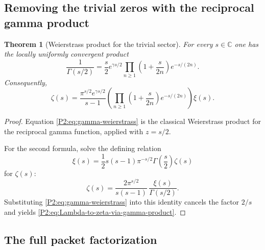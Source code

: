 \documentclass[11pt,a4paper]{article}
\numberwithin{equation}{section}
\newtheorem{theorem}{Theorem}[section]
\theoremstyle{definition}
\theoremstyle{remark}
\newcommand{\CC}{\mathbb C}
\begin{document}
\subsection{Removing the trivial zeros with the reciprocal gamma product}

\begin{theorem}[Weierstrass product for the trivial sector]\label{P2:thm:gamma-product}
For every $s\in\CC$ one has the locally uniformly convergent product
\begin{equation}\label{P2:eq:gamma-weierstrass}
\frac{1}{\Gamma(s/2)}=\frac{s}{2}e^{\gamma s/2}\prod_{n\ge 1}\left(1+\frac{s}{2n}\right)e^{-s/(2n)}.
\end{equation}
Consequently,
\begin{equation}\label{P2:eq:Lambda-to-zeta-via-gamma-product}
\zeta(s)=\frac{\pi^{s/2}e^{\gamma s/2}}{s-1}\left(\prod_{n\ge 1}\left(1+\frac{s}{2n}\right)e^{-s/(2n)}\right)\xi(s).
\end{equation}
\end{theorem}

\begin{proof}
Equation \eqref{P2:eq:gamma-weierstrass} is the classical Weierstrass product for the reciprocal gamma function, applied with $z=s/2$.

For the second formula, solve the defining relation
\[
\xi(s)=\frac12 s(s-1)\pi^{-s/2}\Gamma\!\left(\frac{s}{2}\right)\zeta(s)
\]
for $\zeta(s)$:
\[
\zeta(s)=\frac{2\pi^{s/2}}{s(s-1)}\,\frac{\xi(s)}{\Gamma(s/2)}.
\]
Substituting \eqref{P2:eq:gamma-weierstrass} into this identity cancels the factor $2/s$ and yields \eqref{P2:eq:Lambda-to-zeta-via-gamma-product}.
\end{proof}

\subsection{The full packet factorization}
\end{document}
